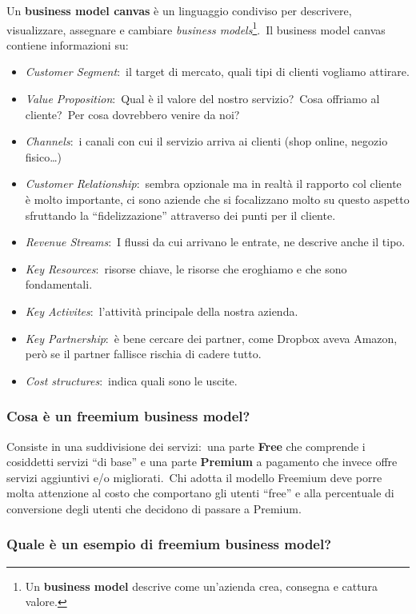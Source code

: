 \documentclass[12pt, a4paper]{article}
\begin{document}
Un \textbf{business model canvas} è un linguaggio condiviso per descrivere, visualizzare, assegnare e cambiare \textit{business models}\footnote{Un \textbf{business model} descrive come un'azienda crea, consegna e cattura valore.}.\
Il business model canvas contiene informazioni su:
\begin{itemize}
    \item \textit{Customer Segment}:\ il target di mercato, quali tipi di clienti vogliamo attirare.
    \item \textit{Value Proposition}:\ Qual è il valore del nostro servizio?\ Cosa offriamo al cliente?\ Per cosa dovrebbero venire da noi?
    \item \textit{Channels}:\ i canali con cui il servizio arriva ai clienti (shop online, negozio fisico\dots)
    \item \textit{Customer Relationship}:\ sembra opzionale ma in realtà il rapporto col cliente è molto importante, ci sono aziende che si focalizzano molto su questo aspetto sfruttando la ``fidelizzazione'' attraverso dei punti per il cliente.
    \item \textit{Revenue Streams}:\ I flussi da cui arrivano le entrate, ne descrive anche il tipo.
    \item \textit{Key Resources}:\ risorse chiave, le risorse che eroghiamo e che sono fondamentali.
    \item \textit{Key Activites}:\ l'attività principale della nostra azienda.
    \item \textit{Key Partnership}:\ è bene cercare dei partner, come Dropbox aveva Amazon, però se il partner fallisce rischia di cadere tutto.
    \item \textit{Cost structures}:\ indica quali sono le uscite.
\end{itemize}

\subsubsection*{Cosa è un freemium business model?}

Consiste in una suddivisione dei servizi:\ una parte \textbf{Free} che comprende i cosiddetti servizi ``di base'' e una parte \textbf{Premium} a pagamento che invece offre servizi aggiuntivi e/o migliorati.\
Chi adotta il modello Freemium deve porre molta attenzione al costo che comportano gli utenti ``free'' e alla percentuale di conversione degli utenti che decidono di passare a Premium.\

\subsubsection*{Quale è un esempio di freemium business model?}
\end{document}
